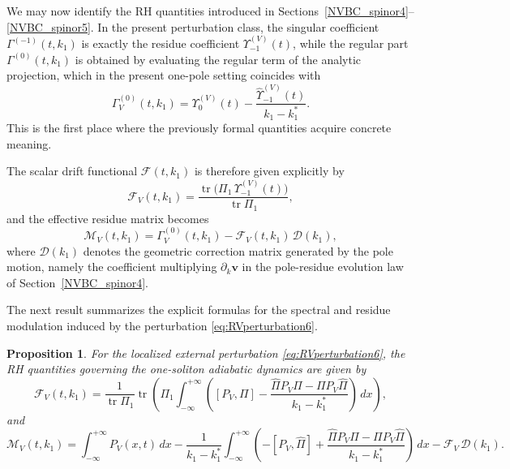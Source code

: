 \documentclass[11pt]{amsart}
\newtheorem{proposition}{Proposition}[section]
\theoremstyle{definition}
\numberwithin{equation}{section}
\begin{document}
We may now identify the RH quantities introduced in Sections~\ref{NVBC_spinor4}--\ref{NVBC_spinor5}. In the present perturbation class, the singular coefficient $\Gamma^{(-1)}(t,k_1)$ is exactly the residue coefficient $\Upsilon_{-1}^{(V)}(t)$, while the regular part $\Gamma^{(0)}(t,k_1)$ is obtained by evaluating the regular term of the analytic projection, which in the present one-pole setting coincides with
\begin{equation}
\Gamma^{(0)}_V(t,k_1)=\Upsilon_0^{(V)}(t)-\frac{\widehat\Upsilon_{-1}^{(V)}(t)}{k_1-k_1^*}.
\label{eq:Gamma0V6}
\end{equation}
This is the first place where the previously formal quantities acquire concrete meaning.

The scalar drift functional $\mathcal F(t,k_1)$ is therefore given explicitly by
\begin{equation}
\mathcal F_V(t,k_1)
=
\frac{\operatorname{tr}\bigl(\Pi_1\,\Upsilon_{-1}^{(V)}(t)\bigr)}{\operatorname{tr}\Pi_1},
\label{eq:FVexplicit6}
\end{equation}
and the effective residue matrix becomes
\begin{equation}
\mathcal M_V(t,k_1)
=
\Gamma^{(0)}_V(t,k_1)-\mathcal F_V(t,k_1)\,\mathcal D(k_1),
\label{eq:MVexplicit6}
\end{equation}
where $\mathcal D(k_1)$ denotes the geometric correction matrix generated by the pole motion, namely the coefficient multiplying $\partial_k\mathbf v$ in the pole-residue evolution law of Section~\ref{NVBC_spinor4}.

The next result summarizes the explicit formulas for the spectral and residue modulation induced by the perturbation \eqref{eq:RVperturbation6}.

\begin{proposition}
For the localized external perturbation \eqref{eq:RVperturbation6}, the RH quantities governing the one-soliton adiabatic dynamics are given by
\begin{equation}
\mathcal F_V(t,k_1)
=
\frac{1}{\operatorname{tr}\Pi_1}
\operatorname{tr}
\left(
\Pi_1
\int_{-\infty}^{+\infty}
\left(
[P_V,\Pi]
-
\frac{\widehat\Pi P_V\Pi-\Pi P_V\widehat\Pi}{k_1-k_1^*}
\right)\,dx
\right),
\label{eq:FVfull6}
\end{equation}
and
\begin{equation}
\mathcal M_V(t,k_1)
=
\int_{-\infty}^{+\infty} P_V(x,t)\,dx
-
\frac{1}{k_1-k_1^*}
\int_{-\infty}^{+\infty}
\left(
-[P_V,\widehat\Pi]
+
\frac{\widehat\Pi P_V\Pi-\Pi P_V\widehat\Pi}{k_1-k_1^*}
\right)\,dx
-
\mathcal F_V\,\mathcal D(k_1).
\label{eq:MVfull6}
\end{equation}
\end{proposition}
\end{document}
